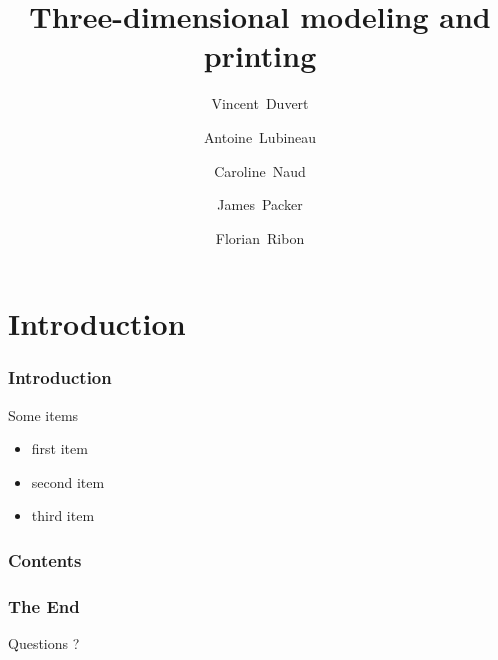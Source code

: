 \documentclass{beamer}
\title{Three-dimensional modeling and printing}
\subtitle{}
\author[V. D., A. L., C. N., J. P., F. R.]{Vincent~Duvert\and Antoine~Lubineau \and Caroline~Naud \and James~Packer \and Florian~Ribon}
\institute{INP-ENSEEIHT}
\begin{document}
\frame{\titlepage}

\section{Introduction}
\begin{frame}
	\frametitle{Introduction}

    \begin{block}{Some items}
        \begin{itemize}
            \item first item
            \pause
            \item second item
            \pause
            \item third item
        \end{itemize}
    \end{block}
\end{frame}

\begin{frame}
	\frametitle{Contents}
	\tableofcontents
\end{frame}

\begin{frame}
	\frametitle{The End}

	\begin{center}
		Questions ?
	\end{center}
\end{frame}
	
\end{document}
